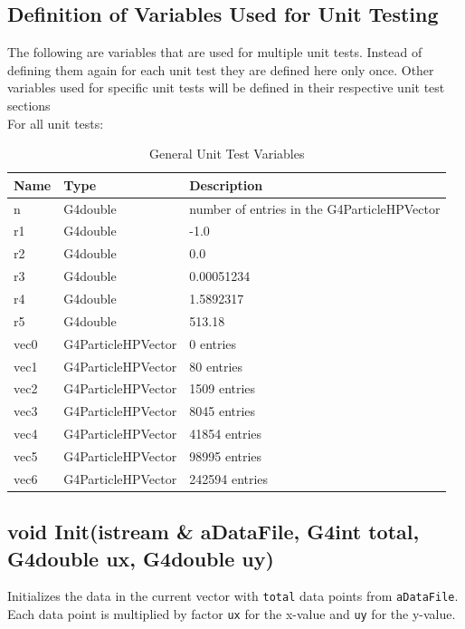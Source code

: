 \documentclass[12pt]{article}
\newcommand{\todo}[1]{\textcolor{red}{[TODO: #1]}} \else
\newcommand{\authornote}[3]{} \newcommand{\todo}[1]{} \fi
\newcommand{\ds}[1]{\authornote{blue}{DS}{#1}}
\begin{document}
\subsection{Definition of Variables Used for Unit Testing}
The following are variables that are used for multiple unit tests. Instead of defining them again for each unit test they are defined here only once. Other variables used for specific unit tests will be defined in their respective unit test sections\\
For all unit tests:
\begin{table}[H]
\centering
\caption{General Unit Test Variables}\label{gen_var_table}
\begin{tabular}{lll}
\toprule
	\bf Name & \bf Type & \bf Description\\\midrule
	n 	& G4double 			& number of entries in the G4ParticleHPVector\\
	r1 	& G4double 			& -1.0\\
	r2	& G4double			& 0.0\\
	r3 	& G4double 			& 0.00051234\\
	r4 	& G4double 			& 1.5892317\\
	r5 	& G4double 			& 513.18\\
	vec0 & G4ParticleHPVector 	& 0 entries\\
	vec1 & G4ParticleHPVector	& 80 entries\\
	vec2 & G4ParticleHPVector 	& 1509 entries\\
	vec3 & G4ParticleHPVector 	& 8045 entries\\
	vec4 & G4ParticleHPVector 	& 41854 entries\\
	vec5 & G4ParticleHPVector 	& 98995 entries\\
	vec6 & G4ParticleHPVector 	& 242594 entries\\
\bottomrule		
\end{tabular}
\end{table}

\ds{Where do you define your tolerance?}

\subsection{void Init(istream \& aDataFile, G4int total, G4double ux, G4double uy)} 
	Initializes the data in the current vector with \texttt{total} data points from \texttt{aDataFile}. Each data
	point is multiplied by factor \texttt{ux} for the x-value and \texttt{uy} for the y-value.
\end{document}
